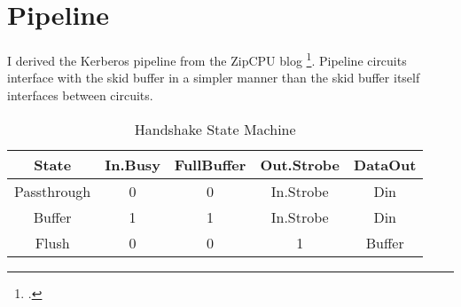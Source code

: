 \section{Pipeline}

I derived the Kerberos pipeline from the ZipCPU blog \footcite{ZipCPU.Pipeline}.  Pipeline circuits interface with the skid buffer in a simpler manner than the skid buffer itself interfaces between circuits.

\begin{table}[ht]
    \caption{Handshake State Machine} %
    \centering %
    \begin{tabular}{c c c c c} %
        \hline\hline
        State & In.Busy & FullBuffer & Out.Strobe & DataOut \\ [0.5ex] %

        \hline
        Passthrough & 0 & 0 & In.Strobe & Din \\
        Buffer & 1 & 1 & In.Strobe & Din \\
        Flush & 0 & 0 & 1 & Buffer \\ [1ex]
        \hline
    \end{tabular}
    \label{table:pipeline-handshake-circuit-state}
\end{table}

